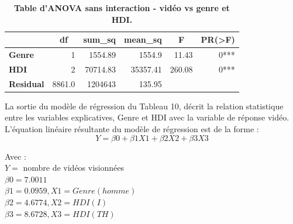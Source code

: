 \documentclass[12pt, a4paper, titlepage, table]{article}
\begin{document}
	\begin{table}[H]
		\centering
		\fontsize{12}{20}\selectfont
		\begin{tabular}{|l|r|r|r|r|r|}
			\hline
					\multicolumn{1}{|c|}{\textbf{}}&
					\multicolumn{1}{c|}{\textbf{df}}&
					\multicolumn{1}{c|}{\textbf{sum\_sq}}&
					\multicolumn{1}{c|}{\textbf{mean\_sq}}&
					\multicolumn{1}{c|}{\textbf{F}}&
					\multicolumn{1}{c|}{\textbf{PR(>F)}}\\
			\hline
				\textbf{Genre}&	1&	1554.89&	1554.9&	11.43&	0***\\
				\textbf{HDI}&	2&	70714.83&	35357.41&	260.08&	0***\\
				\textbf{Residual}&	8861.0&	1204643&	135.95&		&		\\
			\hline
		\end{tabular}
		\caption{\textbf{Table d'ANOVA sans interaction - vidéo vs genre et HDI.}}
	\end{table}

	La sortie du modèle de régression du Tableau 10, décrit la relation statistique entre les variables explicatives, Genre et HDI 
	avec la variable de réponse vidéo. L'équation linéaire résultante du modèle de régression est de la forme : 
	\[ Y=\beta0 + \beta1X1 + \beta2X2 + \beta3X3 \]
	
	Avec :\\
	$Y =$ nombre de vidéos visionnées\\
	$\beta0 = 7.0011$\\
	$\beta1 = 0.0959, X1 = Genre(homme)$\\
	$\beta2 = 4.6774, X2 = HDI(I)$\\
	$\beta3 = 8.6728, X3 = HDI(TH)$\\
	
\end{document}
